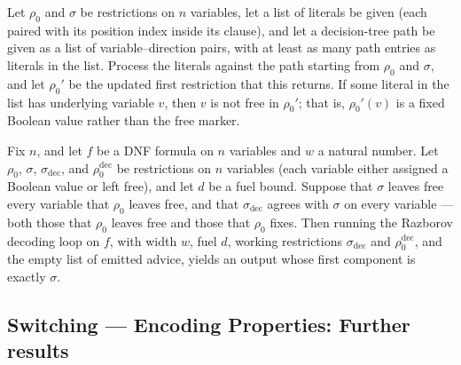 \begin{lemma}
\label{SwitchingLemma.processClauseLits_rho_ne_none_of_mem}
\leanok
{}
Let $\rho_0$ and $\sigma$ be restrictions on $n$ variables, let a list of literals be
given (each paired with its position index inside its clause), and let a decision-tree
path be given as a list of variable–direction pairs, with at least as many path entries
as literals in the list. Process the literals against the path starting from $\rho_0$
and $\sigma$, and let $\rho_0'$ be the updated first restriction that this returns. If
some literal in the list has underlying variable $v$, then $v$ is not free in $\rho_0'$;
that is, $\rho_0'(v)$ is a fixed Boolean value rather than the free marker.
\end{lemma}

\begin{lemma}
\label{SwitchingLemma.roundtrip_base}
\leanok
{}
Fix $n$, and let $f$ be a DNF formula on $n$ variables and $w$ a natural number. Let
$\rho_0$, $\sigma$, $\sigma_{\mathrm{dec}}$, and $\rho_0^{\mathrm{dec}}$ be restrictions
on $n$ variables (each variable either assigned a Boolean value or left free), and let
$d$ be a fuel bound. Suppose that $\sigma$ leaves free every variable that $\rho_0$
leaves free, and that $\sigma_{\mathrm{dec}}$ agrees with $\sigma$ on every variable —
both those that $\rho_0$ leaves free and those that $\rho_0$ fixes. Then running the
Razborov decoding loop on $f$, with width $w$, fuel $d$, working restrictions
$\sigma_{\mathrm{dec}}$ and $\rho_0^{\mathrm{dec}}$, and the empty list of emitted
advice, yields an output whose first component is exactly $\sigma$.
\end{lemma}

\subsection*{Switching --- Encoding Properties: Further results}

